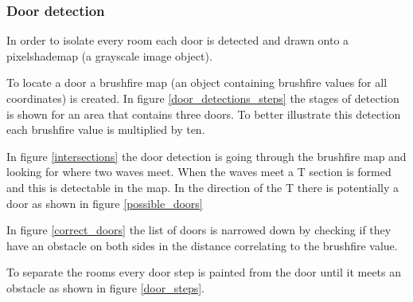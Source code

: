 \subsubsection{Door detection}
In order to isolate every room each door is detected and drawn onto a pixelshademap (a grayscale image object).

To locate a door a brushfire map (an object containing brushfire values for all coordinates) is created. 
In figure \ref{door_detections_steps} the stages of detection is shown for an area that contains three doors.
To better illustrate this detection each brushfire value is multiplied by ten.

In figure \ref{intersections} the door detection is going through the brushfire map and looking for where two waves meet.
When the waves meet a T section is formed and this is detectable in the map. 
In the direction of the T there is potentially a door as shown in figure \ref{possible_doors}

In figure \ref{correct_doors} the list of doors is narrowed down by checking if they have an obstacle on both sides in the distance correlating to the brushfire value.

To separate the rooms every door step is painted from the door until it meets an obstacle as shown in figure \ref{door_steps}.

